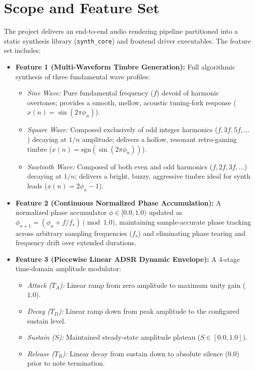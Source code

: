 \documentclass[12pt,a4paper,oneside]{book}
\begin{document}
\section{Scope and Feature Set}
The project delivers an end-to-end audio rendering pipeline partitioned into a static synthesis library (\texttt{synth\_core}) and frontend driver executables. The feature set includes:

\begin{itemize}
    \item \textbf{Feature 1 (Multi-Waveform Timbre Generation):} Full algorithmic synthesis of three fundamental wave profiles:
    \begin{itemize}
        \item \textit{Sine Wave:} Pure fundamental frequency ($f$) devoid of harmonic overtones; provides a smooth, mellow, acoustic tuning-fork response ($x(n) = \sin(2\pi \phi_n)$).
        \item \textit{Square Wave:} Composed exclusively of odd integer harmonics ($f, 3f, 5f, \dots$) decaying at $1/n$ amplitude; delivers a hollow, resonant retro-gaming timbre ($x(n) = \text{sgn}(\sin(2\pi \phi_n))$).
        \item \textit{Sawtooth Wave:} Composed of both even and odd harmonics ($f, 2f, 3f, \dots$) decaying at $1/n$; delivers a bright, buzzy, aggressive timbre ideal for synth leads ($x(n) = 2\phi_n - 1$).
    \end{itemize}

    \item \textbf{Feature 2 (Continuous Normalized Phase Accumulation):} A normalized phase accumulator $\phi \in [0.0, 1.0)$ updated as $\phi_{n+1} = (\phi_n + f / f_s) \pmod{1.0}$, maintaining sample-accurate phase tracking across arbitrary sampling frequencies ($f_s$) and eliminating phase tearing and frequency drift over extended durations.

    \item \textbf{Feature 3 (Piecewise Linear ADSR Dynamic Envelope):} A 4-stage time-domain amplitude modulator:
    \begin{itemize}
        \item \textit{Attack ($T_A$):} Linear ramp from zero amplitude to maximum unity gain ($1.0$).
        \item \textit{Decay ($T_D$):} Linear ramp down from peak amplitude to the configured sustain level.
        \item \textit{Sustain ($S$):} Maintained steady-state amplitude plateau ($S \in [0.0, 1.0]$).
        \item \textit{Release ($T_R$):} Linear decay from sustain down to absolute silence ($0.0$) prior to note termination.
    \end{itemize}


\end{itemize}
\end{document}
